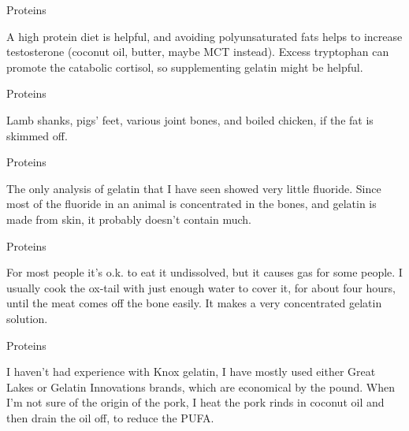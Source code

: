 \documentclass[11pt,oneside,openany,extrafontsizes]{memoir}
\begin{document}
\begin{standalonequote}{Proteins}

    \begin{answer}
        A high protein diet is helpful, and avoiding polyunsaturated fats helps to increase testosterone (coconut oil, butter, maybe MCT instead). Excess tryptophan can promote the catabolic cortisol, so supplementing gelatin might be helpful.
    \end{answer}
\end{standalonequote}

\begin{standalonequote}{Proteins}

    \begin{answer}
        Lamb shanks, pigs' feet, various joint bones, and boiled chicken, if the fat is skimmed off.
    \end{answer}
\end{standalonequote}

\begin{standalonequote}{Proteins}

    \begin{answer}
        The only analysis of gelatin that I have seen showed very little fluoride. Since most of the fluoride in an animal is concentrated in the bones, and gelatin is made from skin, it probably doesn't contain much.
    \end{answer}
\end{standalonequote}

\begin{standalonequote}{Proteins}

    \begin{answer}
        For most people it's o.k. to eat it undissolved, but it causes gas for some people. I usually cook the ox-tail with just enough water to cover it, for about four hours, until the meat comes off the bone easily. It makes a very concentrated gelatin solution.
    \end{answer}
\end{standalonequote}

\begin{standalonequote}{Proteins}

    \begin{answer}
        I haven't had experience with Knox gelatin, I have mostly used either Great Lakes or Gelatin Innovations brands, which are economical by the pound. When I'm not sure of the origin of the pork, I heat the pork rinds in coconut oil and then drain the oil off, to reduce the PUFA.
    \end{answer}
\end{standalonequote}
\end{document}

